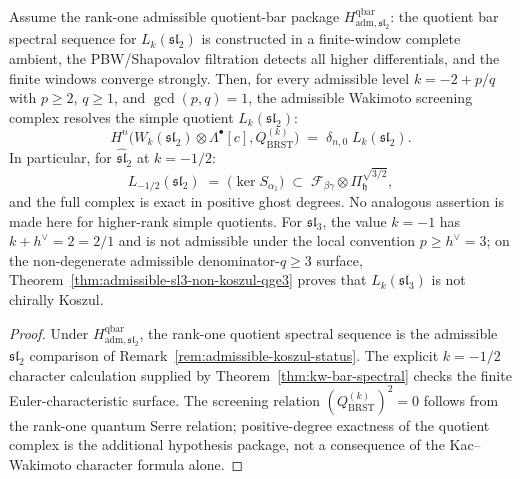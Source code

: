 \begin{corollary}
\label{cor:wakimoto-brst-admissible}
\ClaimStatusConditional
{}
Assume the rank-one admissible quotient-bar package
$H_{\mathrm{adm},\mathfrak{sl}_2}^{\mathrm{qbar}}$: the quotient bar
spectral sequence for $L_k(\mathfrak{sl}_2)$ is constructed in a
finite-window complete ambient, the PBW/Shapovalov filtration detects
all higher differentials, and the finite windows converge strongly.
Then, for every admissible level $k=-2+p/q$ with $p\geq2$,
$q\geq1$, and $\gcd(p,q)=1$, the admissible Wakimoto screening complex
resolves the simple quotient $L_k(\mathfrak{sl}_2)$:
\[
H^n\bigl(W_k(\mathfrak{sl}_2)\otimes\Lambda^\bullet[c],
Q_{\mathrm{BRST}}^{(k)}\bigr)
\;=\;
\delta_{n,0}\;L_k(\mathfrak{sl}_2).
\]
In particular, for $\widehat{\mathfrak{sl}}_2$ at $k=-1/2$:
\[
L_{-1/2}(\mathfrak{sl}_2)
\;=\;
\bigl(\ker S_{\alpha_1}\bigr) \;\subset\;
\mathcal{F}_{\beta\gamma}\otimes\Pi^{\sqrt{3/2}}_{\mathfrak{h}},
\]
and the full complex is exact in positive ghost degrees.
No analogous assertion is made here for higher-rank simple quotients.
For $\mathfrak{sl}_3$, the value $k=-1$ has $k+h^\vee=2=2/1$ and is
not admissible under the local convention $p\geq h^\vee=3$; on the
non-degenerate admissible denominator-$q\geq3$ surface,
Theorem~\ref{thm:admissible-sl3-non-koszul-qge3} proves that
$L_k(\mathfrak{sl}_3)$ is not chirally Koszul.
\end{corollary}

\begin{proof}
Under $H_{\mathrm{adm},\mathfrak{sl}_2}^{\mathrm{qbar}}$, the
rank-one quotient spectral sequence is the admissible
$\mathfrak{sl}_2$ comparison of
Remark~\ref{rem:admissible-koszul-status}. The explicit $k=-1/2$
character calculation supplied by Theorem~\ref{thm:kw-bar-spectral}
checks the finite Euler-characteristic surface. The screening relation
$(Q_{\mathrm{BRST}}^{(k)})^2=0$ follows from the rank-one quantum
Serre relation; positive-degree exactness of the quotient complex is
the additional hypothesis package, not a consequence of the
Kac--Wakimoto character formula alone.
\end{proof}

